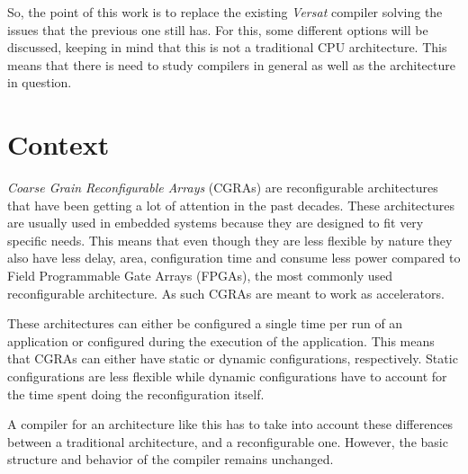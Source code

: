 So, the point of this work is to replace the existing {\it Versat} compiler
solving the issues that the previous one still has. For this, some different options
will be discussed, keeping in mind that this is not a traditional CPU
architecture. This means that there is need to study compilers in general as
well as the architecture in question.



\section{Context}
\label{section:context}
	
{\it Coarse Grain Reconfigurable Arrays} ({\sc CGRAs}) are reconfigurable
architectures that have been getting a lot of attention in the past decades.
These architectures are usually used in embedded systems because they are
designed to fit very specific needs. This means that even though they are less
flexible by nature they also have less delay, area, configuration time and
consume less power compared to Field Programmable Gate Arrays ({\sc FPGAs}), the
most commonly used reconfigurable architecture. As such CGRAs are meant to work
as accelerators.

These architectures can either be configured a single time per run of an
application or configured during the execution of the application. This means
that {\sc CGRAs} can either have static or dynamic configurations, respectively.
Static configurations are less flexible while dynamic configurations have to
account for the time spent doing the reconfiguration itself.

A compiler for an architecture like this has to take into account these
differences between a traditional architecture, and a reconfigurable one.
However, the basic structure and behavior of the compiler remains unchanged.


